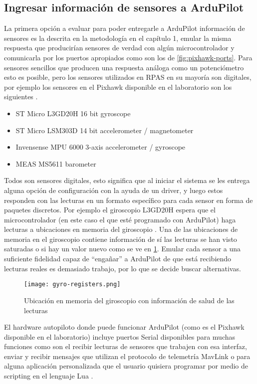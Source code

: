 \subsection{Ingresar información de sensores a ArduPilot}

La primera opción a evaluar para poder entregarle a ArduPilot información de sensores es la descrita en la metodología en el capítulo 1, emular la misma respuesta que producirían sensores de verdad con algún microcontrolador y comunicarla por los puertos apropiados como son los de \cref{fig:pixhawk-ports}. Para sensores sencillos que producen una respuesta análoga como un potenciómetro esto es posible, pero los sensores utilizados en RPAS en su mayoría son digitales, por ejemplo los sensores en el Pixhawk disponible en el laboratorio son los siguientes \cite{pixhawk1}.

\begin{itemize}
    \item ST Micro L3GD20H 16 bit gyroscope
    \item ST Micro LSM303D 14 bit accelerometer / magnetometer
    \item Invensense MPU 6000 3-axis accelerometer / gyroscope
    \item MEAS MS5611 barometer
\end{itemize}

Todos son sensores digitales, esto significa que al iniciar el sistema se les entrega alguna opción de configuración con la ayuda de un driver, y luego estos responden con las lecturas en un formato específico para cada sensor en forma de paquetes discretos. Por ejemplo el giroscopio L3GD20H espera que el microcontrolador (en este caso el que esté programado con ArduPilot) haga lecturas a ubicaciones en memoria del giroscopio \cite{gyro-datasheet}. Una de las ubicaciones de memoria en el giroscopio contiene información de sí las lecturas se han visto saturadas o si hay un valor nuevo como se ve en \cref{fig:gyro-health}. Emular cada sensor a una suficiente fidelidad capaz de ``engañar'' a ArduPilot de que está recibiendo lecturas reales es demasiado trabajo, por lo que se decide buscar alternativas.

\begin{figure}[h]
    \centering
    \texttt{[image: gyro-registers.png]}
    \caption{Ubicación en memoria del giroscopio con información de salud de las lecturas}
    \label{fig:gyro-health}
\end{figure}

El hardware autopiloto donde puede funcionar ArduPilot (como es el Pixhawk disponible en el laboratorio) incluye puertos Serial disponibles para muchas funciones como son el recibir lecturas de sensores que trabajen con esa interfaz, enviar y recibir mensajes que utilizan el protocolo de telemetría MavLink \cite{ap-serial} o para alguna aplicación personalizada que el usuario quisiera programar por medio de scripting en el lenguaje Lua \cite{ap-scripting}.

